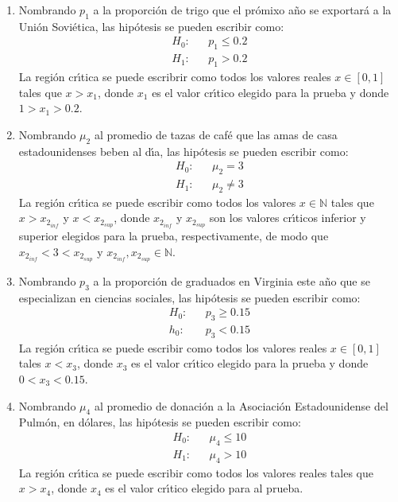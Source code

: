 \begin{solucion}
 $\phantom{0}$
 \begin{enumerate}
  \item Nombrando $p_1$ a la proporci\'on de trigo
  que el pr\'omixo a\~no se exportar\'a a la Uni\'on Sovi\'etica,
  las hip\'otesis se pueden escribir como:
  \begin{eqnarray*}
   H_0: & & p_1 \leq 0.2 \\
   H_1: & & p_1 > 0.2
  \end{eqnarray*}
  La regi\'on cr\'{\i}tica se puede escribrir como todos los valores reales
  $x \in [0,1]$ tales que $x > x_1$, donde $x_1$ es el valor cr\'{\i}tico
  elegido para la prueba y donde $1 > x_1 > 0.2$.

  \item Nombrando $\mu_2$ al promedio de tazas de caf\'e
  que las amas de casa estadounidenses beben al d\'{\i}a,
  las hip\'otesis se pueden escribir como:
  \begin{eqnarray*}
   H_0: & & \mu_2 = 3 \\
   H_1: & & \mu_2 \neq 3
  \end{eqnarray*}
  La regi\'on cr\'{\i}tica se puede escribir como todos los valores
  $x\in \mathbb{N}$ tales que $x > x_{2_{inf}}$ y $x < x_{2_{sup}}$,
  donde $x_{2_{inf}}$ y $x_{2_{sup}}$ son los valores cr\'{\i}ticos
  inferior y superior elegidos para la prueba, respectivamente,
  de modo que $x_{2_{inf}} < 3 < x_{2_{sup}}$
  y $x_{2_{inf}}, x_{2_{sup}} \in \mathbb{N}$.
  
  \item Nombrando $p_3$ a la proporci\'on de graduados en Virginia este
  a\~no que se especializan en ciencias sociales,
  las hip\'otesis se pueden escribir como:
  \begin{eqnarray*}
   H_0: & & p_3 \geq 0.15 \\
   h_0: & & p_3   <  0.15
  \end{eqnarray*}
  La regi\'on cr\'{\i}tica se puede escribir como todos los valores reales
  $x \in [0,1]$ tales $x < x_3$, donde $x_3$ es el valor cr\'{\i}tico
  elegido para la prueba y donde $0 < x_3 < 0.15$.
  
  \item Nombrando $\mu_4$ al promedio de donaci\'on a la Asociaci\'on
  Estadounidense del Pulm\'on, en d\'olares,
  las hip\'otesis se pueden escribir como:
  \begin{eqnarray*}
   H_0: & & \mu_4 \leq 10 \\
   H_1: & & \mu_4   >  10
  \end{eqnarray*}
  La regi\'on cr\'{\i}tica se puede escribir como todos los valores reales
  tales que $x > x_4$, donde $x_4$ es el valor cr\'{\i}tico elegido
  para al prueba.
  

\end{enumerate}
\end{solucion}
